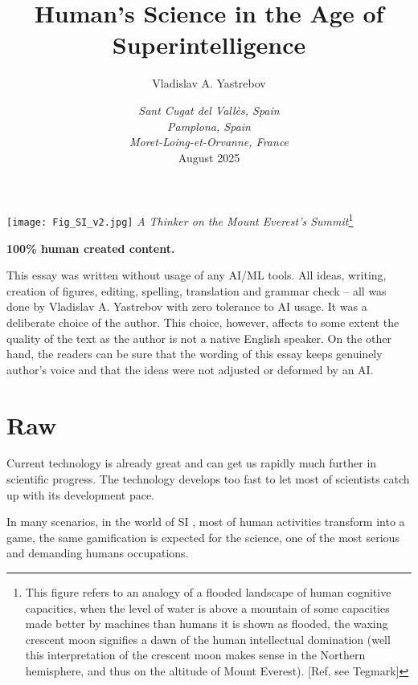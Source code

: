 \documentclass[a4paper,11pt]{article}
\title{Human's Science in the Age of Superintelligence}
\author{Vladislav A. Yastrebov}
\date{\footnotesize\textit{Sant Cugat del Vall\`es, Spain}\\
\textit{Pamplona, Spain}\\
\textit{Moret-Loing-et-Orvanne, France}\\
August 2025}
\begin{document}
\maketitle

\begin{center}
    \texttt{[image: Fig\_SI\_v2.jpg]}
    \textit{A Thinker on the Mount Everest's Summit}\footnote{This figure refers to an analogy of a flooded landscape of human cognitive capacities, when the level of water is above a mountain of some capacities made better by machines than humans it is shown as flooded, the waxing crescent moon signifies a dawn of the human intellectual domination (well this interpretation of the crescent moon makes sense in the Northern hemisphere, and thus on the altitude of Mount Everest). [Ref, see Tegmark] }

    \vspace{0.5cm}
    \footnotesize 
    \textbf{100\% human created content.} 
\end{center}
\vspace{-1em}
\footnotesize \noindent
This essay was written without usage of any AI/ML tools. All ideas, writing, creation of figures, editing, spelling, translation and grammar check -- all was done by Vladislav A. Yastrebov with zero tolerance to AI usage. It was a deliberate choice of the author. This choice, however, affects to some extent the quality of the text as the author is not a native English speaker. On the other hand, the readers can be sure that the wording of this essay keeps genuinely author's voice and that the ideas were not adjusted or deformed by an AI.

    \newpage
 	\tableofcontents


    \printnomenclature

    \section{Raw}

    Current technology is already great and can get us rapidly much further in scientific progress. The technology develops too fast to let most of scientists catch up with its development pace.

    In many scenarios, in the world of SI , most of human activities transform into a game, the same gamification is expected for the science, one of the most serious and demanding humans occupations.
    
\end{document}

